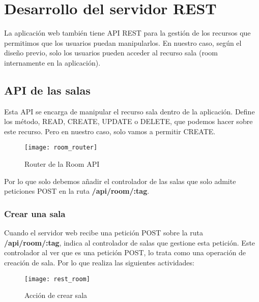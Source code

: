 \section{Desarrollo del servidor REST}

La aplicación web también tiene API REST para la gestión de los recursos que permitimos que los usuarios puedan manipularlos. En nuestro caso, según el diseño previo, solo los usuarios pueden acceder al recurso sala (room internamente en la aplicación).

\subsection{API de las salas}

Esta API se encarga de manipular el recurso sala dentro de la aplicación. Define los método, READ, CREATE, UPDATE o DELETE, que podemos hacer sobre este recurso. Pero en nuestro caso, solo vamos a permitir CREATE.

\begin{figure}[htp!]
  \centering
  \texttt{[image: room\_router]}
  \caption{Router de la Room API}
  \label{fig:room_router}
\end{figure}

Por lo que solo debemos añadir el controlador de las salas que solo admite peticiones POST en la ruta \textbf{/api/room/:tag}.

\subsubsection{Crear una sala}

Cuando el servidor web recibe una petición POST sobre la ruta \textbf{/api/room/:tag}, indica al controlador de salas que gestione esta petición. Este controlador al ver que es una petición POST, lo trata como una operación de creación de sala. Por lo que realiza las siguientes actividades:

\begin{figure}[htp!]
  \centering
  \texttt{[image: rest\_room]}
  \caption{Acción de crear sala}
  \label{fig:rest_room}
\end{figure}

